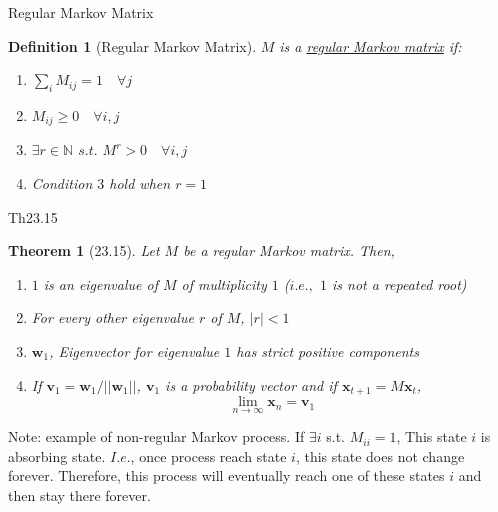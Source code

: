 \documentclass[final]{beamer}
\newtheorem{defn}{Definition}
\newtheorem{thm}{Theorem}
\newcommand{\bb}{\mathbb}
\newcommand{\bd}{\mathbf}
\begin{document}
\begin{frame}[t]{Regular Markov Matrix}
	\begin{defn}
		[Regular Markov Matrix] $M$ is a \uline{regular Markov matrix} if:
		\begin{enumerate}
			\item $\sum_{i} M_{ij} = 1 \quad \forall j$
			\item $M_{ij}\ge 0\quad \forall i,j$
			\item $\exists r\in\bb{N}$ $s.t.$ $M^r>0\quad\forall i,j$
			\item Condition $3$ hold when $r=1$
		\end{enumerate}
	\end{defn}

\end{frame}

\begin{frame}[t]{Th23.15}
	\begin{thm}
		[23.15] Let $M$ be a regular Markov matrix. Then,
		\begin{enumerate}
			\item $1$ is an eigenvalue of $M$ of multiplicity $1$ ($i.e.,$ $1$ is not a repeated root)
			\item For every other eigenvalue $r$ of $M$, $|r|<1$
			\item $\bd{w}_1$, Eigenvector for eigenvalue $1$ has strict positive components
			\item If $\bd{v}_1 = \bd{w}_1/||\bd{w}_1||$, $\bd{v}_1$ is a probability vector and if $\bd{x}_{t+1}=M\bd{x}_t$, \[
				\lim_{n\rightarrow\infty}\bd{x}_n = \bd{v}_1
			\]
		\end{enumerate}
	\end{thm}
	Note: example of non-regular Markov process. If $\exists i$ s.t. $M_{ii}=1$, This state $i$ is absorbing state. $I.e.$, once process reach state $i$, this state does not change forever. Therefore, this process will eventually reach one of these states $i$ and then stay there forever.
\end{frame}
\end{document}
